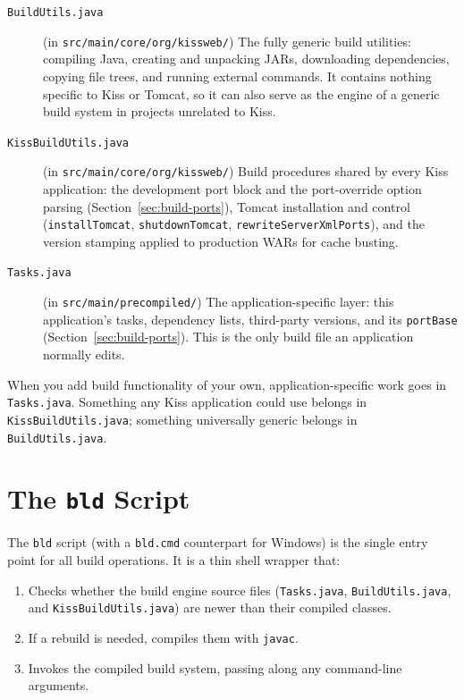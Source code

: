 \begin{description}
  \item[\texttt{BuildUtils.java}] (in \texttt{src/main/core/org/kissweb/}) The fully generic build utilities: compiling Java, creating and unpacking JARs, downloading dependencies, copying file trees, and running external commands.  It contains nothing specific to Kiss or Tomcat, so it can also serve as the engine of a generic build system in projects unrelated to Kiss.
  \item[\texttt{KissBuildUtils.java}] (in \texttt{src/main/core/org/kissweb/}) Build procedures shared by every Kiss application: the development port block and the port-override option parsing (Section~\ref{sec:build-ports}), Tomcat installation and control (\texttt{installTomcat}, \texttt{shutdownTomcat}, \texttt{rewriteServerXmlPorts}), and the version stamping applied to production WARs for cache busting.
  \item[\texttt{Tasks.java}] (in \texttt{src/main/precompiled/}) The application-specific layer: this application's tasks, dependency lists, third-party versions, and its \texttt{portBase} (Section~\ref{sec:build-ports}).  This is the only build file an application normally edits.
\end{description}

\noindent
When you add build functionality of your own, application-specific work goes in \texttt{Tasks.java}.  Something any Kiss application could use belongs in \texttt{KissBuildUtils.java}; something universally generic belongs in \texttt{BuildUtils.java}.

\section{The \texttt{bld} Script}
\label{sec:build-bld}

The \texttt{bld} script (with a \texttt{bld.cmd} counterpart for Windows) is the single entry point for all build operations.  It is a thin shell wrapper that:

\begin{enumerate}
  \item Checks whether the build engine source files (\texttt{Tasks.java}, \texttt{BuildUtils.java}, and \texttt{KissBuildUtils.java}) are newer than their compiled classes.
  \item If a rebuild is needed, compiles them with \texttt{javac}.
  \item Invokes the compiled build system, passing along any command-line arguments.
\end{enumerate}

